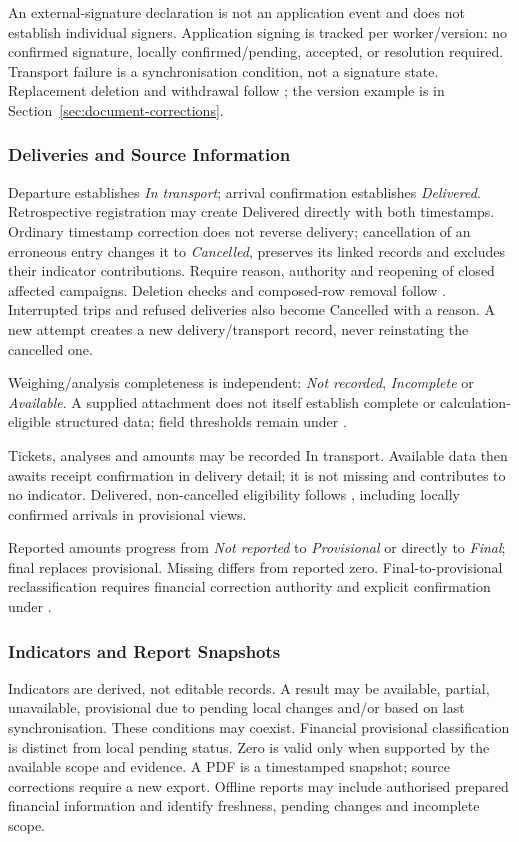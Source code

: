 An external-signature declaration is not an application event and does not
establish individual signers. Application signing is tracked per worker/version:
no confirmed signature, locally confirmed/pending, accepted, or resolution required.
Transport failure is a synchronisation condition, not a signature state.
Replacement deletion and withdrawal follow \hyperref[br:026]{}; the version
example is in Section~\ref{sec:document-corrections}.

\subsubsection{Deliveries and Source Information}
Departure establishes \textit{In transport}; arrival confirmation establishes
\textit{Delivered}. Retrospective registration may create Delivered directly
with both timestamps. Ordinary timestamp correction does not reverse delivery;
cancellation of an erroneous entry changes it to \textit{Cancelled}, preserves its linked records and excludes their indicator contributions. Require reason, authority and reopening of closed affected campaigns. Deletion checks and composed-row removal follow \hyperref[br:031]{}. Interrupted trips and refused deliveries also become Cancelled with a reason. A new attempt creates a new delivery/transport record, never reinstating the cancelled one.

Weighing/analysis completeness is independent: \textit{Not recorded},
\textit{Incomplete} or \textit{Available}. A supplied attachment does not itself
establish complete or calculation-eligible structured data; field thresholds
remain under .

Tickets, analyses and amounts may be recorded In transport. Available data then
awaits receipt confirmation in delivery detail; it is not missing and contributes
to no indicator. Delivered, non-cancelled eligibility follows
\hyperref[br:038]{}, including locally confirmed arrivals in provisional views.

Reported amounts progress from \textit{Not reported} to \textit{Provisional}
or directly to \textit{Final}; final replaces provisional. Missing differs
from reported zero. Final-to-provisional reclassification requires financial correction authority and explicit confirmation under .

\subsubsection{Indicators and Report Snapshots}
Indicators are derived, not editable records. A result may be available,
partial, unavailable, provisional due to pending local changes and/or based
on last synchronisation. These conditions may coexist. Financial provisional
classification is distinct from local pending status. Zero is valid only
when supported by the available scope and evidence.
A PDF is a timestamped snapshot; source corrections require a new export.
Offline reports may include authorised prepared financial information and identify freshness, pending changes and incomplete scope.



